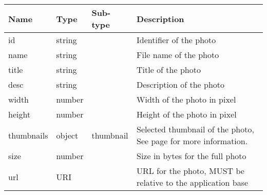 \documentclass[a4paper,12pt]{report}
\newcommand{\see}[1]{See page \pageref{#1} for more information.}
\begin{document}
	\begin{tabular}{|l|l|l|p{10cm}|}
		\hline
		Name & Type & Sub-type & Description\\\hline
		id & string & & Identifier of the photo\\\hline
		name & string & & File name of the photo\\\hline
		title & string & & Title of the photo\\\hline
		desc & string & & Description of the photo \\\hline
		width & number & & Width of the photo in pixel\\\hline
		height & number & & Height of the photo in pixel\\\hline
		thumbnails & object & thumbnail & Selected thumbnail of the photo, \see{obj:thumbnail}\\\hline
		size & number & & Size in bytes for the full photo\\\hline
		url & URI & & URL for the photo, MUST be relative to the application base\\\hline
	\end{tabular}
\end{document}

